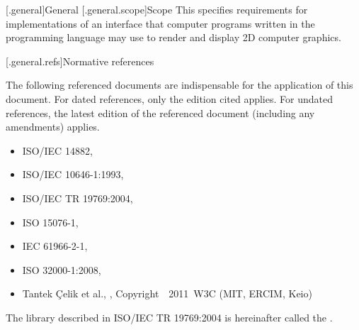 [\iotwod.general]{General}
[\iotwod.general.scope]{Scope}
\pnum
{}%
This \documenttypename{} specifies requirements for implementations
of an interface that computer programs written in the \Cpp programming
language may use to render and display 2D computer graphics.

[\iotwod.general.refs]{Normative references}

\pnum
{}%
The following referenced documents are indispensable for the application
of this document. For dated references, only the edition cited applies.
For undated references, the latest edition of the referenced document
(including any amendments) applies.

\begin{itemize}
\item ISO/IEC 14882, 
\item ISO/IEC 10646-1:1993, 
\item ISO/IEC TR 19769:2004, 
\item ISO 15076-1, 
\item IEC 61966-2-1, 
\item ISO 32000-1:2008, 
\item Tantek \c{C}elik et al., , 
Copyright~\textcopyright~2011~W3C\textsuperscript{\textregistered} (MIT, ERCIM, 
Keio)
\end{itemize}

\pnum
The library described in ISO/IEC TR 19769:2004 is hereinafter called the
.

